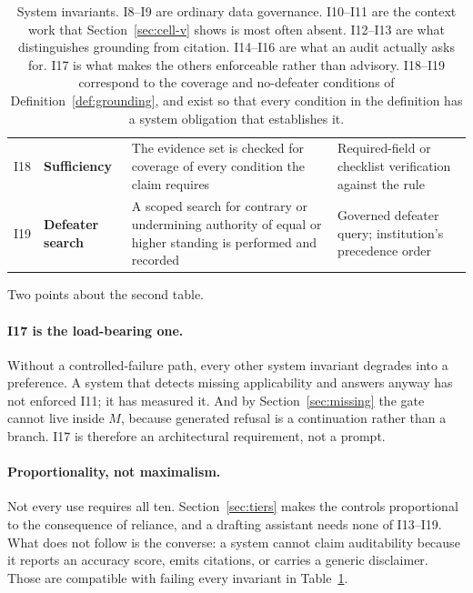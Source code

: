 \documentclass[11pt]{article}
\theoremstyle{plain}
\theoremstyle{definition}
\begin{document}
\begin{table}[ht]
\begin{tabular}{@{}>{\raggedright\arraybackslash}p{0.7cm}>{\raggedright\arraybackslash}p{3.3cm}>{\raggedright\arraybackslash}p{4.6cm}>{\raggedright\arraybackslash}p{4.4cm}@{}}
    \addlinespace
    I18 & \textbf{Sufficiency}
       & The evidence set is checked for coverage of every condition the claim requires
       & Required-field or checklist verification against the rule \\
    \addlinespace
    I19 & \textbf{Defeater search}
       & A scoped search for contrary or undermining authority of equal or higher
         standing is performed and recorded
       & Governed defeater query; institution's precedence order \\
    \bottomrule
  \end{tabular}
  \caption{System invariants. I8--I9 are ordinary data governance. I10--I11 are the
    context work that Section~\ref{sec:cell-v} shows is most often absent.
    I12--I13 are what distinguishes grounding from citation. I14--I16 are what an
    audit actually asks for. I17 is what makes the others enforceable rather than
    advisory. I18--I19 correspond to the coverage and no-defeater conditions of
    Definition~\ref{def:grounding}, and exist so that every condition in the definition
    has a system obligation that establishes it.}
  \label{tab:invariants-system}
\end{table}

Two points about the second table.

\paragraph{I17 is the load-bearing one.} Without a controlled-failure path, every
other system invariant degrades into a preference. A system that detects missing
applicability and answers anyway has not enforced I11; it has measured it. And by
Section~\ref{sec:missing} the gate cannot live inside $M$, because generated
refusal is a continuation rather than a branch. I17 is therefore an architectural
requirement, not a prompt.

\paragraph{Proportionality, not maximalism.} Not every use requires all ten.
Section~\ref{sec:tiers} makes the controls proportional to the consequence of
reliance, and a drafting assistant needs none of I13--I19. What does not follow is
the converse: a system cannot claim auditability because it reports an accuracy
score, emits citations, or carries a generic disclaimer. Those are compatible with
failing every invariant in Table~\ref{tab:invariants-system}.
\end{document}
